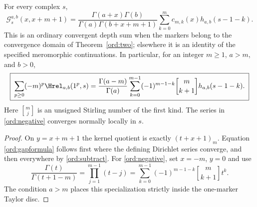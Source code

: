 \begin{corollary}
\label{ord:gap}
For every complex $s$,
\begin{equation}\label{ord:gapformula}
 \mathscr G_s^{a,b}(x,x+m+1)=
 \frac{\Gamma(a+x)\Gamma(b)}
      {\Gamma(a)\Gamma(b+x+m+1)}
       \sum_{k=0}^m c_{m,k}(x)h_{a,b}(s-1-k).
\end{equation}
This is an ordinary convergent depth sum when the markers belong to the
convergence domain of Theorem~\ref{ord:two}; elsewhere it is an identity
of the specified meromorphic continuations.
In particular, for an integer $m\ge1$, $a>m$, and $b>0$,
\begin{equation}\label{ord:negative}
 \boxed{\;
 \sum_{p\ge0}(-m)^p\Hrel_{a,b}(1^p,s)
 =\frac{\Gamma(a-m)}{\Gamma(a)}
    \sum_{k=0}^{m-1}(-1)^{m-1-k}
           \genfrac{[}{]}{0pt}{}{m}{k+1}h_{a,b}(s-1-k).
 \;}
\end{equation}
Here $\genfrac{[}{]}{0pt}{}{m}{j}$ is an unsigned Stirling number of the
first kind.  The series in \eqref{ord:negative} converges normally
locally in $s$.
\end{corollary}

\begin{proof}
On $y=x+m+1$ the kernel quotient is exactly $(t+x+1)_m$.
Equation \eqref{ord:gapformula} follows first where the defining
Dirichlet series converge, and then everywhere by
\eqref{ord:subtract}.  For \eqref{ord:negative}, set $x=-m$, $y=0$
and use
\[
 \frac{\Gamma(t)}{\Gamma(t+1-m)}
   =\prod_{j=1}^{m-1}(t-j)
   =\sum_{k=0}^{m-1}(-1)^{m-1-k}
                      \genfrac{[}{]}{0pt}{}{m}{k+1}t^k.
\]
The condition $a>m$ places this specialization strictly inside the
one-marker Taylor disc.
\end{proof}

